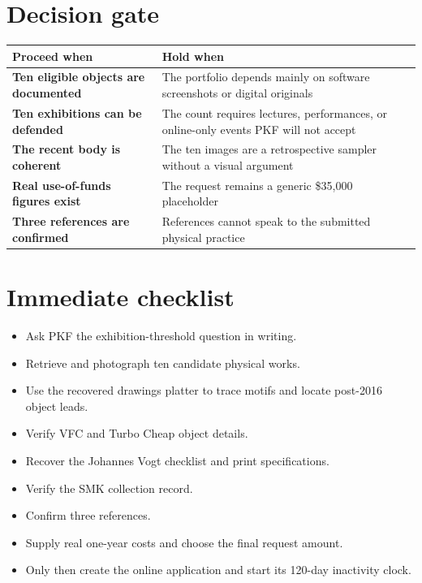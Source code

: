 \documentclass[11pt,letterpaper]{article}
\newcommand{\todo}{\textcolor{acpink}{\fbox{\rule{0pt}{0.55em}\rule{0.55em}{0pt}}}}
\begin{document}
\section{Decision gate}

\begin{tabularx}{\textwidth}{>{\bfseries}p{}X}
\toprule
Proceed when & Hold when \\
\midrule
Ten eligible objects are documented & The portfolio depends mainly on software screenshots or digital originals \\
Ten exhibitions can be defended & The count requires lectures, performances, or online-only events PKF will not accept \\
The recent body is coherent & The ten images are a retrospective sampler without a visual argument \\
Real use-of-funds figures exist & The request remains a generic \$35,000 placeholder \\
Three references are confirmed & References cannot speak to the submitted physical practice \\
\bottomrule
\end{tabularx}

\section{Immediate checklist}

\begin{itemize}
\item[\todo] Ask PKF the exhibition-threshold question in writing.
\item[\todo] Retrieve and photograph ten candidate physical works.
\item[\todo] Use the recovered drawings platter to trace motifs and locate post-2016 object leads.
\item[\todo] Verify VFC and Turbo Cheap object details.
\item[\todo] Recover the Johannes Vogt checklist and print specifications.
\item[\todo] Verify the SMK collection record.
\item[\todo] Confirm three references.
\item[\todo] Supply real one-year costs and choose the final request amount.
\item[\todo] Only then create the online application and start its 120-day inactivity clock.
\end{itemize}
\end{document}
